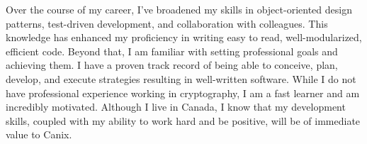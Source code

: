 Over the course of my career, I’ve broadened my skills in object-oriented design patterns, test-driven development, and collaboration with colleagues. 
This knowledge has enhanced my proficiency in writing easy to read, well-modularized, efficient code.
Beyond that, I am familiar with setting professional goals and achieving them. 
I have a proven track record of being able to conceive, plan, develop, and execute strategies resulting in well-written software. 
While I do not have professional experience working in cryptography, I am a fast learner and am incredibly motivated.
Although I live in Canada, I know that my development skills, coupled with my ability to work hard and be positive, will be of immediate value to Canix.